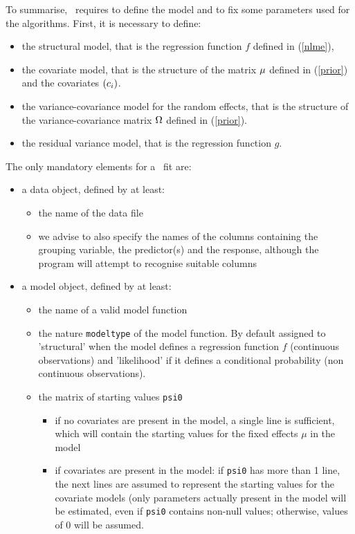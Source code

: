 To summarise, \monolix~requires to define the model and to fix some parameters used for the algorithms. First, it is necessary to define:
\begin{itemize}
\item the structural model, that is the regression function $f$ defined in (\ref{nlme}),
\item the covariate model, that is the structure of the matrix $\fixed_effect$ defined in (\ref{prior}) and the covariates $(c_i)$.
\item the variance-covariance model for the random effects, that is the structure of the variance-covariance matrix ${\Omega}$ defined in (\ref{prior}).
\item the residual variance model, that is the regression function $g$.
\end{itemize}
The only mandatory elements for a \monolix~fit are:
\begin{itemize}
\item a data object, defined by at least: 
   \begin{itemize}
   \item the name of the data file
   \item we advise to also specify the names of the columns containing the grouping variable, the predictor(s) and the response, although the program will attempt to recognise suitable columns
   \end{itemize}
\item a model object, defined by at least:
   \begin{itemize}
   \item the name of a valid model function
   \item the nature \texttt{modeltype} of the model function. By default assigned to 'structural' when the model defines a regression function $f$ (continuous observations) and 'likelihood' if it defines a conditional probability (non continuous observations).
   \item the matrix of starting values \texttt{psi0}
      \begin{itemize}
      \item if no covariates are present in the model, a single line is sufficient, which will contain the starting values for the fixed effects $\mu$ in the model
      \item if covariates are present in the model: if \texttt{psi0} has more than 1 line, the next lines are assumed to represent the starting values for the covariate models (only parameters actually present in the model will be estimated, even if \texttt{psi0} contains non-null values; otherwise, values of 0 will be assumed.
      \end{itemize}
   \end{itemize}
\end{itemize}

